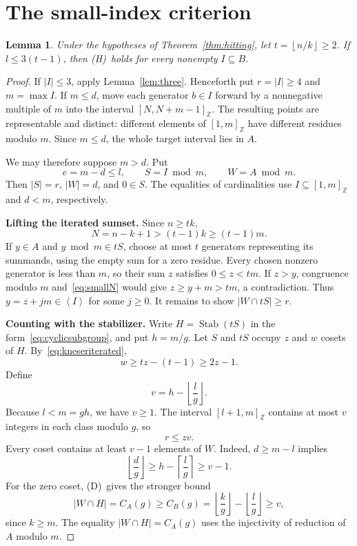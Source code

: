 \documentclass[11pt,a4paper]{article}
\numberwithin{equation}{section}
\newtheorem{lemma}[theorem]{Lemma}
\theoremstyle{remark}
\newcommand{\Z}{\mathbb Z}
\newcommand{\sg}[1]{\left\langle #1\right\rangle}
\newcommand{\floor}[1]{\left\lfloor #1\right\rfloor}
\newcommand{\ceil}[1]{\left\lceil #1\right\rceil}
\DeclareMathOperator{\Stab}{Stab}
\newcommand{\Dcond}{\textup{(D)}}
\newcommand{\Hcond}{\textup{(H)}}
\newcommand{\interval}[2]{[#1,#2]_{\Z}}
\begin{document}
\section{The small-index criterion}\label{sec:small}

\begin{lemma}\label{lem:small}
Under the hypotheses of Theorem~\ref{thm:hitting}, let
$t=\floor{n/k}\ge2$. If $l\le3(t-1)$, then \Hcond\ holds for every
nonempty $I\subseteq B$.
\end{lemma}

\begin{proof}
If $|I|\le3$, apply Lemma~\ref{lem:three}.
Henceforth put $r=|I|\ge4$ and $m=\max I$.
If $m\le d$, move each generator $b\in I$ forward by a nonnegative
multiple of $m$ into the interval $\interval{N}{N+m-1}$.
The resulting points are representable and distinct: different
elements of $\interval{1}{m}$ have different residues modulo $m$.
Since $m\le d$, the whole target interval lies in $A$.

We may therefore suppose $m>d$. Put
\[
  e=m-d\le l,\qquad
  S=I\bmod m,\qquad W=A\bmod m.
\]
Then $|S|=r$, $|W|=d$, and $0\in S$.
The equalities of cardinalities use $I\subseteq\interval{1}{m}$
and $d<m$, respectively.

\textbf{Lifting the iterated sumset.}
Since $n\ge tk$,
\begin{equation}\label{eq:smallN}
  N=n-k+1>(t-1)k\ge(t-1)m.
\end{equation}
If $y\in A$ and $y\bmod m\in tS$, choose at most $t$ generators
representing its summands, using the empty sum for a zero residue.
Every chosen nonzero generator is less than $m$, so their sum $z$
satisfies $0\le z<tm$.
If $z>y$, congruence modulo $m$ and~\eqref{eq:smallN} would give
$z\ge y+m>tm$, a contradiction.
Thus $y=z+jm\in\sg{I}$ for some $j\ge0$.
It remains to show $|W\cap tS|\ge r$.

\textbf{Counting with the stabilizer.}
Write $H=\Stab(tS)$ in the form~\eqref{eq:cyclicsubgroup}, and put
$h=m/g$. Let $S$ and $tS$ occupy $z$ and $w$ cosets of $H$.
By~\eqref{eq:kneseriterated},
\begin{equation}\label{eq:smallkneser}
  w\ge tz-(t-1)\ge2z-1.
\end{equation}
Define
\[
  v=h-\floor{\frac{l}{g}}.
\]
Because $l<m=gh$, we have $v\ge1$.
The interval $\interval{l+1}{m}$ contains at most $v$ integers
in each class modulo $g$, so
\begin{equation}\label{eq:smallcapacity}
  r\le zv.
\end{equation}
Every coset contains at least $v-1$ elements of $W$.
Indeed, $d\ge m-l$ implies
\[
  \floor{\frac{d}{g}}
  \ge h-\ceil{\frac{l}{g}}
  \ge v-1.
\]
For the zero coset, \Dcond\ gives the stronger bound
\begin{equation}\label{eq:smallzero}
  |W\cap H|=C_A(g)\ge C_B(g)
  =\floor{\frac{k}{g}}-\floor{\frac{l}{g}}\ge v,
\end{equation}
since $k\ge m$.
The equality $|W\cap H|=C_A(g)$ uses the injectivity of reduction
of $A$ modulo $m$.


\end{proof}
\end{document}
